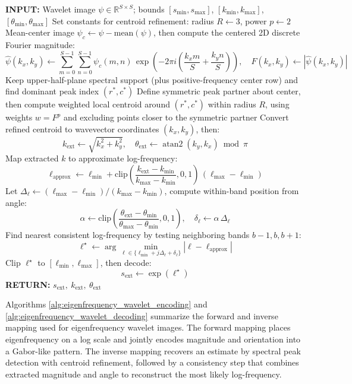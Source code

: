 \documentclass[preprint,review,12pt]{elsarticle}
\begin{document}
\begin{algorithm}[H]
\caption{Eigenfrequency Wavelet Decoding}
\label{alg:eigenfrequency_wavelet_decoding}
\begin{algorithmic}[1]
\STATE \textbf{INPUT:} Wavelet image \( \psi \in \mathbb{R}^{S\times S} \); bounds \( [s_{\min}, s_{\max}] \), \( [k_{\min}, k_{\max}] \), \( [\theta_{\min}, \theta_{\max}] \)
\STATE Set constants for centroid refinement: radius \(R\leftarrow 3\), power \(p\leftarrow 2\)
\STATE Mean-center image \( \psi_c \leftarrow \psi - \mathrm{mean}(\psi) \), then compute the centered 2D discrete Fourier magnitude:
\[
\hat{\psi}(k_x,k_y)\leftarrow \sum_{m=0}^{S-1}\sum_{n=0}^{S-1}\psi_c(m,n)\,
\exp\!\left(-2\pi i\!\left(\frac{k_x m}{S}+\frac{k_y n}{S}\right)\right),\quad
F(k_x,k_y)\leftarrow |\hat{\psi}(k_x,k_y)|
\]
\STATE Keep upper-half-plane spectral support (plus positive-frequency center row) and find dominant peak index \( (r^{*},c^{*}) \)
\STATE Define symmetric peak partner about center, then compute weighted local centroid around \( (r^{*},c^{*}) \) within radius \(R\), using weights \(w=F^p\) and excluding points closer to the symmetric partner
\STATE Convert refined centroid to wavevector coordinates \( (k_x,k_y) \), then:
\[
k_{\mathrm{ext}} \leftarrow \sqrt{k_x^2+k_y^2},\quad
\theta_{\mathrm{ext}} \leftarrow \operatorname{atan2}(k_y,k_x)\bmod \pi
\]
\STATE Map extracted \(k\) to approximate log-frequency:
\[
\ell_{\mathrm{approx}} \leftarrow \ell_{\min} + \mathrm{clip}\!\left(\frac{k_{\mathrm{ext}}-k_{\min}}{k_{\max}-k_{\min}},0,1\right)\,(\ell_{\max}-\ell_{\min})
\]
\STATE Let \( \Delta_\ell \leftarrow (\ell_{\max}-\ell_{\min})/(k_{\max}-k_{\min}) \), compute within-band position from angle:
\[
\alpha \leftarrow \mathrm{clip}\!\left(\frac{\theta_{\mathrm{ext}}-\theta_{\min}}{\theta_{\max}-\theta_{\min}},0,1\right),\quad
\delta_\ell \leftarrow \alpha\,\Delta_\ell
\]
\STATE Find nearest consistent log-frequency by testing neighboring bands \(b-1,b,b+1\):
\[
\ell^\star \leftarrow \arg\min_{\ell \in \{\ell_{\min} + j\Delta_\ell + \delta_\ell\}} |\ell-\ell_{\mathrm{approx}}|
\]
\STATE Clip \( \ell^\star \) to \( [\ell_{\min},\ell_{\max}] \), then decode:
\[
s_{\mathrm{ext}} \leftarrow \exp(\ell^\star)
\]
\STATE \textbf{RETURN:} \( s_{\mathrm{ext}},\ k_{\mathrm{ext}},\ \theta_{\mathrm{ext}} \)
\end{algorithmic}
\end{algorithm}

Algorithms \ref{alg:eigenfrequency_wavelet_encoding} and \ref{alg:eigenfrequency_wavelet_decoding} summarize the forward and inverse mapping used for eigenfrequency wavelet images. The forward mapping places eigenfrequency on a log scale and jointly encodes magnitude and orientation into a Gabor-like pattern. The inverse mapping recovers an estimate by spectral peak detection with centroid refinement, followed by a consistency step that combines extracted magnitude and angle to reconstruct the most likely log-frequency.
\end{document}
